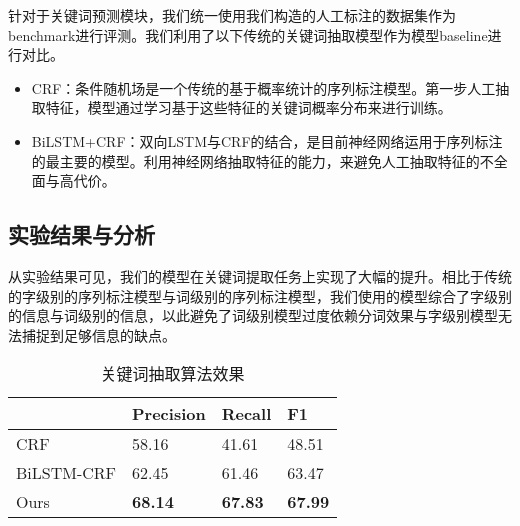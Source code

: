 针对于关键词预测模块，我们统一使用我们构造的人工标注的数据集作为benchmark进行评测。我们利用了以下传统的关键词抽取模型作为模型baseline进行对比。

\begin{itemize}
	\item CRF：条件随机场是一个传统的基于概率统计的序列标注模型。第一步人工抽取特征，模型通过学习基于这些特征的关键词概率分布来进行训练。
	\item BiLSTM+CRF：双向LSTM与CRF的结合，是目前神经网络运用于序列标注的最主要的模型。利用神经网络抽取特征的能力，来避免人工抽取特征的不全面与高代价。
\end{itemize}

\subsection{实验结果与分析}

从实验结果可见，我们的模型在关键词提取任务上实现了大幅的提升。相比于传统的字级别的序列标注模型与词级别的序列标注模型，我们使用的模型综合了字级别的信息与词级别的信息，以此避免了词级别模型过度依赖分词效果与字级别模型无法捕捉到足够信息的缺点。

\begin{table}[]
\center
\begin{tabular}{llll}
\hline
       & Precision  & Recall & F1    \\ \hline
CRF        & 58.16  & 41.61 & 48.51 \\
BiLSTM-CRF & 62.45  & 61.46 & 63.47 \\ \hline
Ours       & \textbf{68.14}  & \textbf{67.83} & \textbf{67.99} \\ \hline
\end{tabular}
\caption{关键词抽取算法效果}
\end{table}

